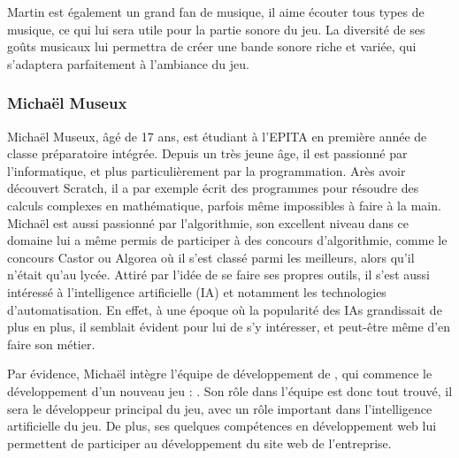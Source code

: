 Martin est également un grand fan de musique, il aime écouter tous types de musique, ce qui lui sera utile pour la partie sonore du jeu.
La diversité de ses goûts musicaux lui permettra de créer une bande sonore riche et variée, qui s'adaptera parfaitement à l'ambiance du jeu.


\subsubsection*{Michaël Museux}

Michaël Museux, âgé de 17 ans, est étudiant à l'EPITA en première année de classe préparatoire intégrée. 
Depuis un très jeune âge, il est passionné par l'informatique, et plus particulièrement par la programmation.
Arès avoir découvert Scratch, il a par exemple écrit des programmes pour résoudre des calculs complexes en mathématique, parfois même impossibles à faire à la main.
Michaël est aussi passionné par l'algorithmie, son excellent niveau dans ce domaine lui a même permis de participer à des concours d'algorithmie, comme le concours Castor ou Algorea où il s'est classé parmi les meilleurs, alors qu'il n'était qu'au lycée. 
Attiré par l'idée de se faire ses propres outils, il s'est aussi intéressé à l’intelligence artificielle (IA) et notamment les technologies d’automatisation.
En effet, à une époque où la popularité des IAs grandissait de plus en plus, il semblait évident pour lui de s'y intéresser, et peut-être même d'en faire son métier.

Par évidence, Michaël intègre l'équipe de développement de \textit{\companyName}, qui commence le développement d'un nouveau jeu : \textit{\gameName}. 
Son rôle dans l'équipe est donc tout trouvé, il sera le développeur principal du jeu, avec un rôle important dans l'intelligence artificielle du jeu.
De plus, ses quelques compétences en développement web lui permettent de participer au développement du site web de l'entreprise.

